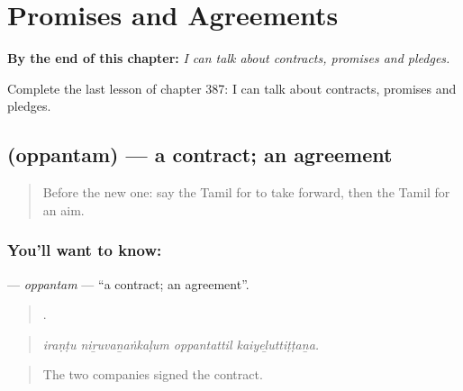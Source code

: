 
\chapter{Promises and Agreements}
\label{ch:ta-promises-and-agreements}

\begin{chapteropening}
\textbf{By the end of this chapter:} \emph{I can talk about contracts, promises and pledges.}

Complete the last lesson of chapter 387: I can talk about contracts, promises and pledges.
\end{chapteropening}

\section[\texorpdfstring{\ta{ஒப்பந்தம்} (oppantam)}{ஒப்பந்தம் (oppantam)}]{ (oppantam) — a contract; an agreement}

\label{lesson:TA-C387-oppantam}



\begin{quote}
Before the new one: say the Tamil for to take forward, then the Tamil for an aim.
\end{quote}

\subsection*{You'll want to know: }
\textbf{} — \emph{oppantam} — \textquotedblleft{}a contract; an agreement\textquotedblright{}.

\begin{quote}
   .
\end{quote}

\begin{quote}
\emph{iraṇṭu niṟuvaṉaṅkaḷum oppantattil kaiyeḻuttiṭṭaṉa.}
\end{quote}

\begin{quote}
The two companies signed the contract.
\end{quote}

